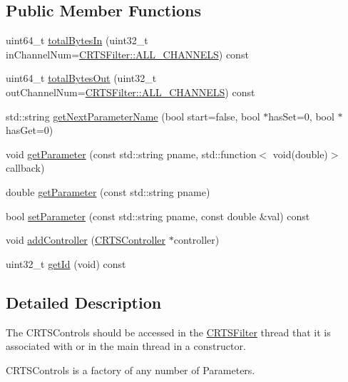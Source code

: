 \subsection*{Public Member Functions}
\begin{DoxyCompactItemize}
\item 
uint64\+\_\+t \hyperlink{classCRTSControl_ad9acd9abb7620a0b34b724b26a47740d}{total\+Bytes\+In} (uint32\+\_\+t in\+Channel\+Num=\hyperlink{classCRTSFilter_a9ea354654e8e2e8ce3bff293cc35fafe}{C\+R\+T\+S\+Filter\+::\+A\+L\+L\+\_\+\+C\+H\+A\+N\+N\+E\+LS}) const
\item 
uint64\+\_\+t \hyperlink{classCRTSControl_ae39f48f9761149fabebe68870ec2b8b8}{total\+Bytes\+Out} (uint32\+\_\+t out\+Channel\+Num=\hyperlink{classCRTSFilter_a9ea354654e8e2e8ce3bff293cc35fafe}{C\+R\+T\+S\+Filter\+::\+A\+L\+L\+\_\+\+C\+H\+A\+N\+N\+E\+LS}) const
\item 
std\+::string \hyperlink{classCRTSControl_a493557760b3354b32de76fc9f60feaed}{get\+Next\+Parameter\+Name} (bool start=false, bool $\ast$has\+Set=0, bool $\ast$has\+Get=0)
\item 
void \hyperlink{classCRTSControl_aca9bf2af70e093eb050f1b964594c9ec}{get\+Parameter} (const std\+::string pname, std\+::function$<$ void(double)$>$ callback)
\item 
double \hyperlink{classCRTSControl_a49b888b6fb53ca9f407b227cc6c93d9b}{get\+Parameter} (const std\+::string pname)
\item 
bool \hyperlink{classCRTSControl_a80591c5f74bac27c33662884dfaa06ac}{set\+Parameter} (const std\+::string pname, const double \&val) const
\item 
void \hyperlink{classCRTSControl_a1cbcd31c134d09cb2619fde63e064727}{add\+Controller} (\hyperlink{classCRTSController}{C\+R\+T\+S\+Controller} $\ast$controller)
\item 
uint32\+\_\+t \hyperlink{classCRTSControl_acfb6005cbc2d5f22fd4703283c9636bd}{get\+Id} (void) const
\end{DoxyCompactItemize}


\subsection{Detailed Description}
The C\+R\+T\+S\+Controls should be accessed in the \hyperlink{classCRTSFilter}{C\+R\+T\+S\+Filter} thread that it is associated with or in the main thread in a constructor.

C\+R\+T\+S\+Controls is a factory of any number of Parameters. 

